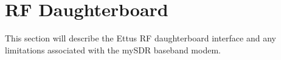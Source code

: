 \section{RF Daughterboard} %
\label{sec:db}
    This section will describe the Ettus RF daughterboard interface and any limitations
    associated with the mySDR baseband modem.
